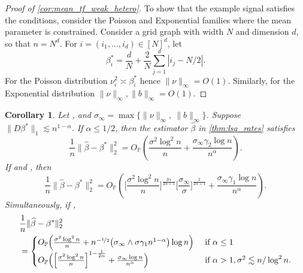 \documentclass[ejs,noshowframe]{imsart}
\theoremstyle{plain}
\newtheorem{corollary}[theorem]{Corollary}
\theoremstyle{definition}
\renewcommand{\P}{\mathbb{P}}
\renewcommand{\hat}{\widehat}
\begin{document}
\begin{appendix}
\begin{proof}[Proof of \autoref{cor:mean_tf_weak_hetero}]
  To show that the example signal satisfies the conditions, consider the Poisson
  and Exponential families where the mean parameter is  
  constrained. 
  Consider a grid graph with width $N$ and dimension $d$, so that $n = N^d$.
  For $i = (i_1, \dots, i_d) \in [N]^d$, let 
  \[
    \beta_i^* = \frac dN + \frac 2N \sum_{j=1}^d |i_j - N/2|.
  \] 
  For the Poisson distribution $\nu^2_i \asymp \beta^*_i$ hence $\| \nu\|_\infty 
  = O(1)$.
  Similarly, for the Exponential distribution $\|\nu\|_\infty, \| b\|_\infty = 
  O(1)$.\qedhere
  
\end{proof}

\begin{corollary}
	\label{cor:mtf_grids_hetero}
	Let , and
	$\sigma_\infty = \max\{ \| \nu \|_\infty,\ \| b \|_\infty \}$.
	Suppose $\|D \beta^* \|_1 \lesssim n^{1-\alpha}$.
  If $\alpha \leq 1/2$, then the estimator $\hat \beta$ in 
		\autoref{thm:lsq_rates} satisfies
		\begin{equation}
		\label{eq:beta_cases_alpha_leq_half}
			\frac{1}{n}\| \hat \beta - \beta^* \|_2^2 = O_\P \left( 
			\frac{\sigma^2 \log^2 n }{n} + \frac{\sigma_\infty\gamma_2\log n}{n^\alpha}
			\right).
		\end{equation}
    If  and , then
    \begin{equation}
      \label{eq:beta_cases_alpha_gtr_half1}
      \frac{1}{n}\| \hat \beta - \beta^* \|_2^2 = O_\P \left( 
        \Big[ \frac{\sigma^2 \log^2 n }{n} \Big]^{\frac{2\alpha}{2\alpha + 1}} 
        \Big[\frac{\sigma_\infty}{\sigma} \Big]^{\frac{2}{2\alpha+1}} + 
        \frac{\sigma_\infty\gamma_1\log n}{n^\alpha}
      \right).
	\end{equation} 
	Simultaneously, if ,
		\begin{align}
		\label{eq:beta_cases_alpha_gtr_half2}
		& \frac{1}{n}\| \hat \beta - \beta^* \|_2^2\\
		&= 
		\begin{cases}
			O_\P \Big( \frac{\sigma^2 \log^2 n }{n} + 
				 n^{-\nicefrac{1}{2}} 
				 \big( \sigma_\infty \wedge \sigma\gamma_1 n^{1-\alpha}  \big) 
				 \log n
				\Big) 
				& \text{ if } \alpha \leq 1\\
		 O_\P \Big( 
			\Big[ \frac{\sigma^2 \log^2 n }{n} \Big]^{1 - \frac{1}{2\alpha}} 
			+ 
			\frac{\sigma_\infty\log n}{n^\alpha}
			\Big)
			& \text{ if } \alpha > 1, \sigma^2 \lesssim n/\log^2 n.
		\end{cases}
	\end{align}
\end{corollary}


\end{appendix}
\end{document}
